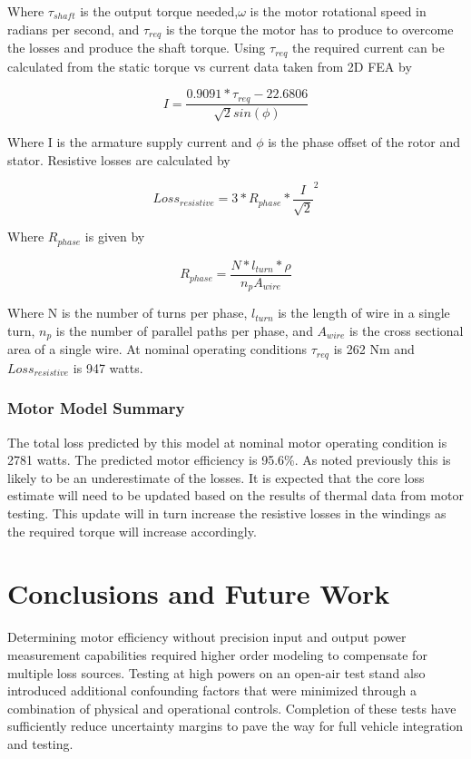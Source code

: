 \documentclass[]{aiaa-tc}%
\begin{document}
Where $\tau_{shaft}$ is the output torque needed,$\omega$ is the motor rotational speed in radians per second, and $\tau_{req}$ is the torque the motor has to produce to overcome the losses and produce the shaft torque. Using $\tau_{req}$ the required current can be calculated from the static torque vs current data taken from 2D FEA by

\begin{equation}
I = \frac{0.9091*\tau_{req}-22.6806}{\sqrt{2}sin(\phi)}
\label{eq:CurrentLoss}
\end{equation}

Where I is the armature supply current and $\phi$ is the phase offset of the rotor and stator.
Resistive losses are calculated by 

\begin{equation}
Loss_{resistive} =3*R_{phase}*\frac{I}{\sqrt{2}}^{2}
\label{eq:ResLoss}
\end{equation}

Where $R_{phase}$ is given by 

\begin{equation}
R_{phase} =\frac{N*l_{turn}*\rho}{n_{p}A_{wire}}
\label{eq:Rphase}
\end{equation}

Where N is the number of turns per phase, $l_{turn}$ is the length of wire in a single turn, $n_{p}$ is the number of parallel paths per phase, and $A_{wire}$ is the cross sectional area of a single wire.
At nominal operating conditions $\tau_{req}$ is 262 Nm and $Loss_{resistive}$ is 947 watts. 


\subsubsection{Motor Model Summary}
The total loss predicted by this model at nominal motor operating condition is 2781 watts. The predicted motor efficiency is 95.6\%. As noted previously this is likely to be an underestimate of the losses. It is expected that the core loss estimate will need to be updated based on the results of thermal data from motor testing. This update will in turn increase the resistive losses in the windings as the required torque will increase accordingly.

\section{Conclusions and Future Work}

Determining motor efficiency without precision input and output power measurement capabilities required higher order modeling to compensate for multiple loss sources. 
Testing at high powers on an open-air test stand also introduced additional confounding factors that were minimized through a combination of physical and operational controls.
Completion of these tests have sufficiently reduce uncertainty margins to pave the way for full vehicle integration and testing.
\end{document}

